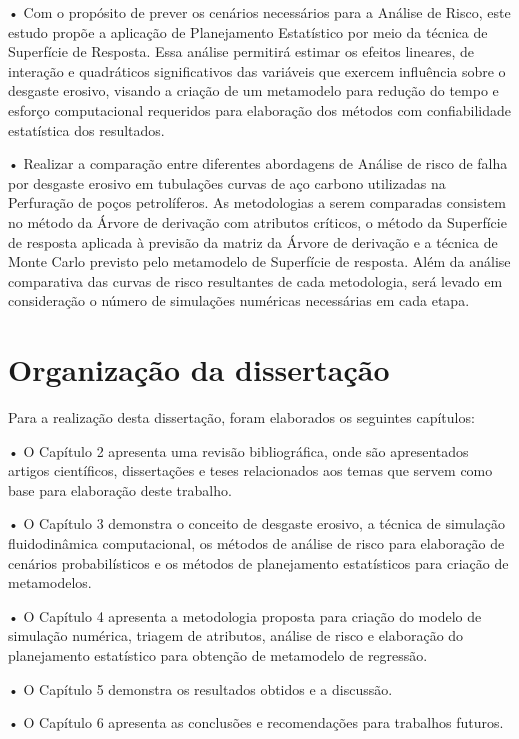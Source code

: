     • Com o propósito de prever os cenários necessários para a Análise de Risco, este estudo propõe a aplicação de Planejamento Estatístico por meio da técnica de Superfície de Resposta. Essa análise permitirá estimar os efeitos lineares, de interação e quadráticos significativos das variáveis que exercem influência sobre o desgaste erosivo, visando a criação de um metamodelo para redução do tempo e esforço computacional requeridos para elaboração dos métodos com confiabilidade estatística dos resultados.

    • Realizar a comparação entre diferentes abordagens de Análise de risco de falha por desgaste erosivo em tubulações curvas de aço carbono utilizadas na Perfuração de poços petrolíferos. As metodologias a serem comparadas consistem no método da Árvore de derivação com atributos críticos, o método da Superfície de resposta aplicada à previsão da matriz da Árvore de derivação e a técnica de Monte Carlo previsto pelo metamodelo de Superfície de resposta. Além da análise comparativa das curvas de risco resultantes de cada metodologia, será levado em consideração o número de simulações numéricas necessárias em cada etapa.

    

\section{Organização da dissertação}

Para a realização desta dissertação, foram elaborados os seguintes capítulos:

• O Capítulo 2 apresenta uma revisão bibliográfica, onde são apresentados artigos científicos, dissertações e teses relacionados aos temas que servem como base para elaboração deste trabalho.

• O Capítulo 3 demonstra o conceito de desgaste erosivo, a técnica de simulação fluidodinâmica computacional, os métodos de análise de risco para elaboração de cenários probabilísticos e os métodos de planejamento estatísticos para criação de metamodelos. 

• O Capítulo 4 apresenta a metodologia proposta para criação do modelo de simulação numérica, triagem de atributos, análise de risco e elaboração do planejamento estatístico para obtenção de metamodelo de regressão.

• O Capítulo 5 demonstra os resultados obtidos e a discussão.

• O Capítulo 6 apresenta as conclusões e recomendações para trabalhos futuros.
